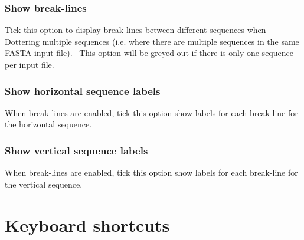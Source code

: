 \documentclass[letterpaper]{article}
\begin{document}
\bigskip

{\color[rgb]{0.30980393,0.5058824,0.7411765}\subsubsection[Show break{}-lines]{Show break-lines}}
{Tick this option to display break-lines between different sequences when
Dottering multiple sequences (i.e. where there are multiple sequences
in the same FASTA input file). \ This option will be greyed out if
there is only one sequence per input file.}

\bigskip

{\color[rgb]{0.30980393,0.5058824,0.7411765}\subsubsection[Show horizontal sequence labels]{Show horizontal sequence labels}}
{When break-lines are enabled, tick this option show labels for each
break-line for the horizontal sequence.}

\bigskip

{\color[rgb]{0.30980393,0.5058824,0.7411765}\subsubsection[Show vertical sequence labels]{Show vertical sequence labels}}
{When break-lines are enabled, tick this option show labels for each
break-line for the vertical sequence.}

\bigskip

{\color[rgb]{0.0,0.27058825,0.5254902}\section[Keyboard shortcuts]{Keyboard shortcuts}}
\end{document}
